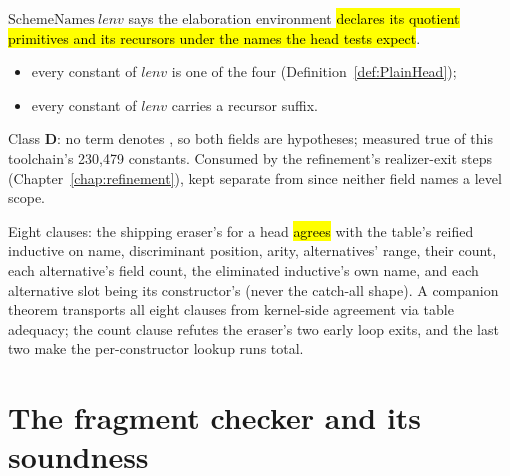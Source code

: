 \begin{definition}
\label{def:SchemeNames}
\leanok
{}
\stAssumed{}  $\mathrm{SchemeNames}\ lenv$ says the elaboration environment
\hl{declares its quotient primitives and its recursors under the names the head tests expect}.
\begin{itemize}
\item every  constant of $lenv$ is one of the four 
(Definition~\ref{def:PlainHead});
\item every  constant of $lenv$ carries a recursor suffix.
\end{itemize}
 Class \textbf{D}: no term denotes , so both fields are hypotheses; measured
true of this toolchain's 230,479 constants. Consumed by the refinement's realizer-exit steps
(Chapter~\ref{chap:refinement}), kept separate from  since neither field names a
level scope.
\end{definition}

\begin{definition}
\label{def:CasesInfoAgrees}
\leanok
{}
 Eight clauses: the shipping eraser's  for a head \hl{agrees}
with the table's reified inductive on name, discriminant position, arity, alternatives' range,
their count, each alternative's field count, the eliminated inductive's own name, and each
alternative slot being its constructor's (never the catch-all shape). A companion theorem
transports all eight clauses from kernel-side agreement via table adequacy; the count clause
refutes the eraser's two early loop exits, and the last two make the per-constructor lookup
 runs total.
\end{definition}

\section{The fragment checker and its soundness}
\label{sec:source:checker}

